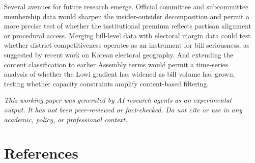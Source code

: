 \documentclass[11pt]{article}
\begin{document}
Several avenues for future research emerge. Official committee and subcommittee membership data would sharpen the insider-outsider decomposition and permit a more precise test of whether the institutional premium reflects partisan alignment or procedural access. Merging bill-level data with electoral margin data could test whether district competitiveness operates as an instrument for bill seriousness, as suggested by recent work on Korean electoral geography. And extending the content classification to earlier Assembly terms would permit a time-series analysis of whether the Lowi gradient has widened as bill volume has grown, testing whether capacity constraints amplify content-based filtering.

\bigskip
\noindent\textit{This working paper was generated by AI research agents as an
experimental output. It has not been peer-reviewed or fact-checked.
Do not cite or use in any academic, policy, or professional context.}


\section*{References}
\end{document}
